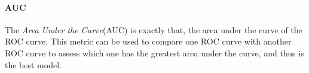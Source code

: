 \paragraph{AUC}
The \textit{Area Under the Curve}(AUC) is exactly that, the area under the curve of the ROC curve. This metric can be used to compare one ROC curve with another ROC curve to assess which one has the greatest area under the curve, and thus is the best model.






